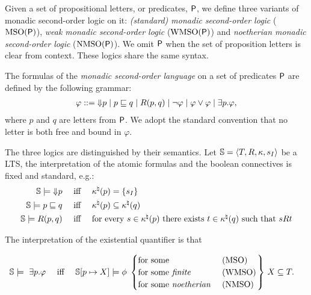 Given a set of propositional letters, or predicates, $\mathsf{P}$, we define three variants of monadic second-order logic on it:
\emph{(standard) monadic second-order logic} ($\mathrm{MSO}(\mathsf{P})$),
\emph{weak monadic second-order logic} ($\mathrm{WMSO}(\mathsf{P})$) and
\emph{noetherian monadic second-order logic} ($\mathrm{NMSO}(\mathsf{P})$).
We omit  $\mathsf{P}$ when the set of proposition letters is clear from context. 
These logics share the same syntax.
\begin{definition}\label{def:mso}
The formulas of the \emph{monadic second-order
language} on a set of predicates $\mathsf{P}$ are defined by the following grammar:
%
\begin{eqnarray*}\label{EQ_mso}
  \varphi ::= \here{p} \mid p \inc q \mid R(p,q) \mid \lnot\varphi \mid \varphi\lor\varphi \mid \exists p.\varphi,
\end{eqnarray*}
where $p$ and $q$ are letters from $\mathsf{P}$.
We  adopt the standard convention that no letter is both free and bound in
$\varphi$.
\end{definition}

The three logics are distinguished by their semantics.
Let  $\mathbb{S} = \langle{T,R,\kappa, s_I}\rangle$ be a LTS, the interpretation of the
atomic formulas and the boolean connectives is fixed and standard, e.g.:
\begin{align*}
\model \models \here{p} & \quad\text{ iff }\quad  \tsval(p) = \compset{s_I} \\
\model \models p \inc q & \quad\text{ iff }\quad  \tsval(p) \subseteq \tsval(q) \\
\model \models R(p,q) & \quad\text{ iff }\quad  \text{for every $s\in \tsval(p)$ there exists $t\in \tsval(q)$ such that $sRt$} 
\end{align*}

The interpretation of the existential quantifier is that

\begin{align*}
\model \models\ \exists p. \varphi  & \quad\text{ iff }\quad  \model[p \mapsto X] \models \phi \,
\left.\begin{cases}
 \text{for some }   & {\bf (\mso)} \\
  \text{for some \emph{finite} }   & {\bf (\wmso)} \\
    \text{for some \emph{noetherian} }   & {\bf (\nmso)} 
 \end{cases}\right\}\,
 X \subseteq T.
\end{align*}

